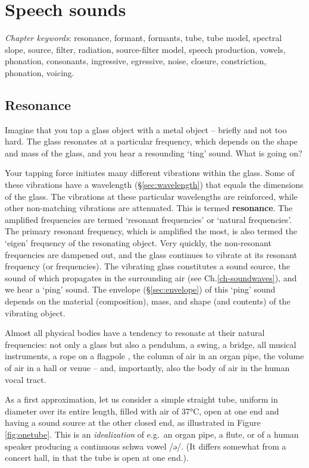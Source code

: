 \documentclass[
]{book}
\begin{document}
\chapter{Speech sounds}\label{ch-speechsounds}

\emph{Chapter keywords}: resonance, formant, formants, tube, tube model, spectral slope, source, filter, radiation, source-filter model, speech production, vowels, phonation, consonants, ingressive, egressive, noise, closure, constriction, phonation, voicing.

\section{Resonance}\label{sec:resonance}

Imagine that you tap a glass object with a metal object -- briefly and not too hard. The glass resonates at a particular frequency, which depends on the shape and mass of the glass, and you hear a resounding `ting' sound. What is going on?

Your tapping force initiates many different vibrations within the glass. Some of these vibrations have a wavelength (§\ref{sec:wavelength}) that equals the dimensions of the glass. The vibrations at these particular wavelengths are reinforced, while other non-matching vibrations are attenuated. This is termed \textbf{resonance}. The amplified frequencies are termed `resonant frequencies' or `natural frequencies'. The primary resonant frequency, which is amplified the most, is also termed the `eigen' frequency of the resonating object. Very quickly, the non-resonant frequencies are dampened out, and the glass continues to vibrate at its resonant frequency (or frequencies). The vibrating glass constitutes a sound source, the sound of which propagates in the surrounding air (see Ch.\ref{ch-soundwaves}), and we hear a `ping' sound. The envelope (§\ref{sec:envelope}) of this `ping' sound depends on the material (composition), mass, and shape (and contents) of the vibrating object.

Almost all physical bodies have a tendency to resonate at their natural frequencies: not only a glass but also a pendulum, a swing, a bridge, all musical instruments, a rope on a flagpole \citep[§61]{Minnaert_1970v2}, the column of air in an organ pipe, the volume of air in a hall or venue -- and, importantly, also the body of air in the human vocal tract.

As a first approximation, let us consider a simple straight tube, uniform in diameter over its entire length, filled with air of 37°C, open at one end and having a sound source at the other closed end, as illustrated in Figure \ref{fig:onetube}. This is an \emph{idealization} of e.g.~an organ pipe, a flute, or of a human speaker producing a continuous schwa vowel /ə/. (It differs somewhat from a concert hall, in that the tube is open at one end.).
\end{document}
